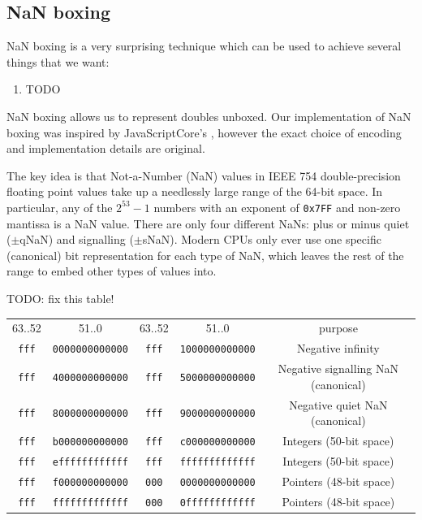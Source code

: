 \documentclass[12pt,a4paper,twoside,openright]{report}
\begin{document}
\subsection{NaN boxing}\label{nan-boxing}

NaN boxing is a very surprising technique which can be used to achieve several things that we want:
\begin{enumerate}
    \item TODO
\end{enumerate}

NaN boxing allows us to represent doubles unboxed. Our implementation of NaN
boxing was inspired by JavaScriptCore's \cite{jscore}, however the exact choice
of encoding and implementation details are original.

The key idea is that Not-a-Number (NaN) values in IEEE 754 double-precision
floating point values take up a needlessly large range of the 64-bit space. In
particular, any of the $2^{53}-1$ numbers with an exponent of \texttt{0x7FF} and
non-zero mantissa is a NaN value. There are only four different NaNs: plus or
minus quiet ($\pm$qNaN) and signalling ($\pm$sNaN). Modern CPUs only ever use
one specific (canonical) bit representation for each type of NaN, which leaves
the rest of the range to embed other types of values into.

TODO: fix this table!

\begin{tabular}{c c | c c | c}
    63..52 & 51..0 & 63..52 & 51..0 & purpose \\
    \lstinline!fff! & \lstinline!0000000000000! & \lstinline!fff! & \lstinline!1000000000000! & Negative infinity \\
    \lstinline!fff! & \lstinline!4000000000000! & \lstinline!fff! & \lstinline!5000000000000! & Negative signalling NaN (canonical) \\
    \lstinline!fff! & \lstinline!8000000000000! & \lstinline!fff! & \lstinline!9000000000000! & Negative quiet NaN (canonical) \\
    \lstinline!fff! & \lstinline!b000000000000! & \lstinline!fff! & \lstinline!c000000000000! & Integers (50-bit space) \\
    \lstinline!fff! & \lstinline!effffffffffff! & \lstinline!fff! & \lstinline!fffffffffffff! & Integers (50-bit space) \\
    \lstinline!fff! & \lstinline!f000000000000! & \lstinline!000! & \lstinline!0000000000000! & Pointers (48-bit space) \\
    \lstinline!fff! & \lstinline!fffffffffffff! & \lstinline!000! & \lstinline!0ffffffffffff! & Pointers (48-bit space)
\end{tabular}
\end{document}
